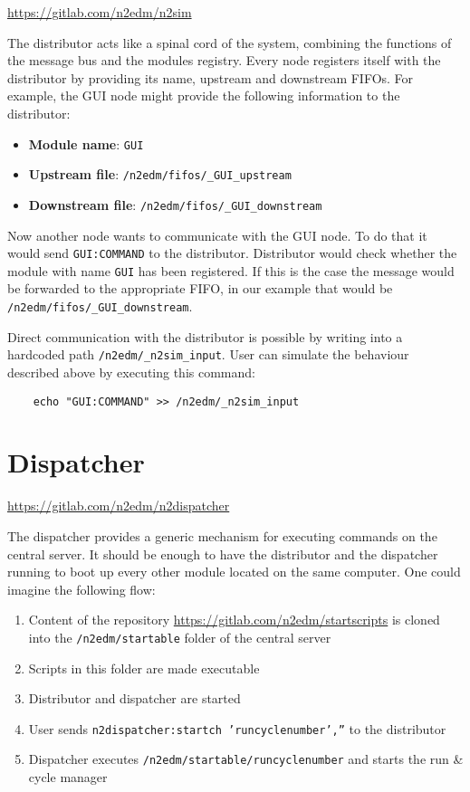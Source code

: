 \url{https://gitlab.com/n2edm/n2sim}

The distributor acts like a spinal cord of the system, combining the functions of the message bus and the modules registry. Every node registers itself with the distributor by providing its name, upstream and downstream FIFOs. For example, the GUI node might provide the following information to the distributor:

\begin{itemize}
	\item \textbf{Module name}: \texttt{GUI}
	\item \textbf{Upstream file}: \texttt{/n2edm/fifos/\_GUI\_upstream}
	\item \textbf{Downstream file}: \texttt{/n2edm/fifos/\_GUI\_downstream}
\end{itemize}

Now another node wants to communicate with the GUI node. To do that it would send \texttt{GUI:COMMAND} to the distributor. Distributor would check whether the module with name \texttt{GUI} has been registered. If this is the case the message would be forwarded to the appropriate FIFO, in our example that would be \texttt{/n2edm/fifos/\_GUI\_downstream}.

Direct communication with the distributor is possible by writing into a hardcoded path \texttt{/n2edm/\_n2sim\_input}. User can simulate the behaviour described above by executing this command:
\begin{verbatim}
	echo "GUI:COMMAND" >> /n2edm/_n2sim_input
\end{verbatim}

\section{Dispatcher}
\label{sec:dispatcher}

\url{https://gitlab.com/n2edm/n2dispatcher}

The dispatcher provides a generic mechanism for executing commands on the central server. It should be enough to have the distributor and the dispatcher running to boot up every other module located on the same computer. One could imagine the following flow:
\begin{enumerate}
	\item Content of the repository \url{https://gitlab.com/n2edm/startscripts} is cloned into the \texttt{/n2edm/startable} folder of the central server
	\item Scripts in this folder are made executable
	\item Distributor and dispatcher are started
	\item User sends \texttt{n2dispatcher:startch 'runcyclenumber',''} to the distributor
	\item Dispatcher executes \texttt{/n2edm/startable/runcyclenumber} and starts the run \& cycle manager
\end{enumerate}

